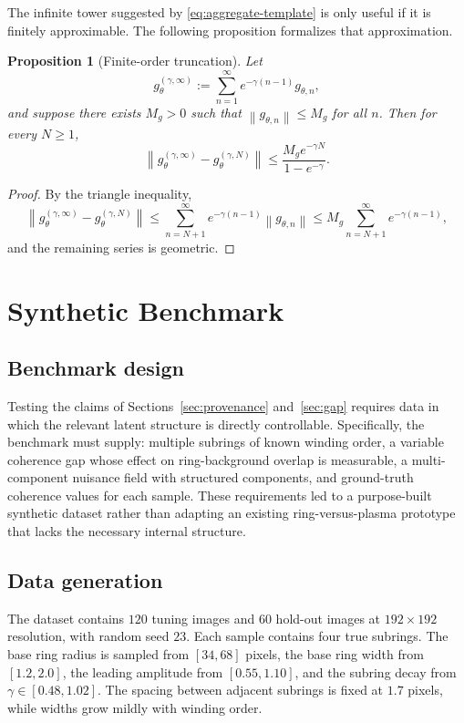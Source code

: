 \documentclass[11pt,a4paper]{article}
\newtheorem{proposition}{Proposition}
\theoremstyle{definition}
\theoremstyle{remark}
\newcommand{\norm}[1]{\left\lVert #1 \right\rVert}
\begin{document}
The infinite tower suggested by \eqref{eq:aggregate-template} is only useful if it is finitely approximable. The following proposition formalizes that approximation.

\begin{proposition}[Finite-order truncation]
\label{prop:truncation}
Let
\[
g_{\theta}^{(\gamma,\infty)}
:=
\sum_{n=1}^{\infty} e^{-\gamma(n-1)} g_{\theta,n},
\]
and suppose there exists $M_g>0$ such that $\norm{g_{\theta,n}}\le M_g$ for all $n$. Then for every $N\ge1$,
\begin{equation}
\norm{g_{\theta}^{(\gamma,\infty)} - g_{\theta}^{(\gamma,N)}}
\le
\frac{M_g e^{-\gamma N}}{1-e^{-\gamma}}.
\label{eq:tail-bound}
\end{equation}
\end{proposition}

\begin{proof}
By the triangle inequality,
\[
\norm{g_{\theta}^{(\gamma,\infty)} - g_{\theta}^{(\gamma,N)}}
\le
\sum_{n=N+1}^{\infty} e^{-\gamma(n-1)} \norm{g_{\theta,n}}
\le
M_g \sum_{n=N+1}^{\infty} e^{-\gamma(n-1)},
\]
and the remaining series is geometric.
\end{proof}

\section{Synthetic Benchmark}

\subsection{Benchmark design}

Testing the claims of Sections~\ref{sec:provenance} and~\ref{sec:gap} requires data in which the relevant latent structure is directly controllable. Specifically, the benchmark must supply: multiple subrings of known winding order, a variable coherence gap whose effect on ring-background overlap is measurable, a multi-component nuisance field with structured components, and ground-truth coherence values for each sample. These requirements led to a purpose-built synthetic dataset rather than adapting an existing ring-versus-plasma prototype that lacks the necessary internal structure.

\subsection{Data generation}

The dataset contains $120$ tuning images and $60$ hold-out images at $192\times192$ resolution, with random seed $23$. Each sample contains four true subrings. The base ring radius is sampled from $[34,68]$ pixels, the base ring width from $[1.2,2.0]$, the leading amplitude from $[0.55,1.10]$, and the subring decay from $\gamma\in[0.48,1.02]$. The spacing between adjacent subrings is fixed at $1.7$ pixels, while widths grow mildly with winding order.
\end{document}
